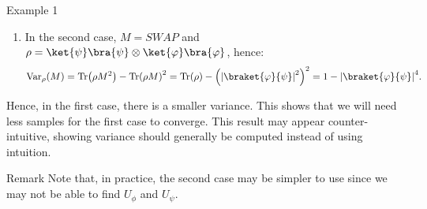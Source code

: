 \documentclass[a4paper]{article}
\begin{document}
\begin{parag}{Example 1}
\begin{enumerate}[left=0pt]
        \item In the second case, $M = SWAP$ and $\rho = \ket{\psi}\bra{\psi} \otimes \ket{\phi}\bra{\phi}$, hence: 
        \[\Var_{\rho}\left(M\right) = \Tr\left(\rho M^2\right) - \Tr\left(\rho M\right)^2 = \Tr\left(\rho\right) - \left(\left|\braket{\phi}{\psi}\right|^2\right)^2 = 1 - \left|\braket{\phi}{\psi}\right|^4.\]
    \end{enumerate}
    
    Hence, in the first case, there is a smaller variance. This shows that we will need less samples for the first case to converge. This result may appear counter-intuitive, showing variance should generally be computed instead of using intuition.

    \begin{subparag}{Remark}
        Note that, in practice, the second case may be simpler to use since we may not be able to find $U_{\phi}$ and $U_{\psi}$.
    \end{subparag}
\end{parag}
\end{document}
